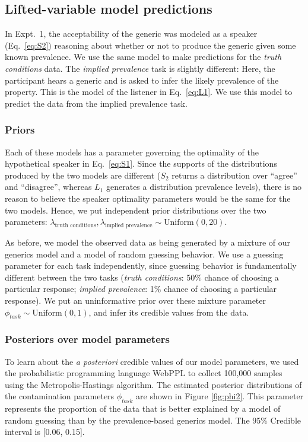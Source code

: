 \documentclass[10pt,letterpaper]{article}
\begin{document}
\subsection{Lifted-variable model predictions}

In Expt.~1, the acceptability of the generic was modeled as a speaker (Eq.~\ref{eq:S2}) reasoning about whether or not to produce the generic given some known prevalence. 
We use the same model to make predictions for the \emph{truth conditions} data.
The \emph{implied prevalence} task is slightly different: Here, the participant hears a generic and is asked to infer the likely prevalence of the property. 
This is the model of the listener in Eq.~\ref{eq:L1}. 
We use this model to predict the data from the implied prevalence task.

\subsubsection{Priors}


Each of these models has a parameter governing the optimality of the hypothetical speaker in Eq.~\ref{eq:S1}. 
Since the supports of the distributions produced by the two models are different ($S_2$ returns a distribution over ``agree'' and ``disagree'', whereas $L_1$ generates a distribution prevalence levels), there is no reason to believe the speaker optimality parameters would be the same for the two models. 
Hence, we put independent prior distributions over the two parameters: $\lambda_{\text{truth conditions}}, \lambda_{\text{implied prevalence}} \sim \text{Uniform}(0, 20)$.

As before, we model the observed data as being generated by a mixture of our generics model and a model of random guessing behavior. 
We use a guessing parameter for each task independently, since guessing behavior is fundamentally different between the two tasks (\emph{truth conditions}: 50\% chance of choosing a particular response; \emph{implied prevalence}: 1\% chance of choosing a particular response).
We put an uninformative prior over these mixture parameter $\phi_{task} \sim \text{Uniform}(0,1)$, and infer its credible values from the data.

\subsubsection{Posteriors over model parameters}

To learn about the \emph{a posteriori} credible values of our model parameters, we used the probabilistic programming language WebPPL \cite{dippl} to collect 100,000 samples using the Metropolis-Hastings algorithm. 
The estimated posterior distributions of the contamination parameters $\phi_{task}$ are shown in Figure \ref{fig:phi2}. 
This parameter represents the proportion of the data that is better explained by a model of random guessing than by the prevalence-based generics model. 
The 95\% Credible interval is [0.06, 0.15]. 
\end{document}
